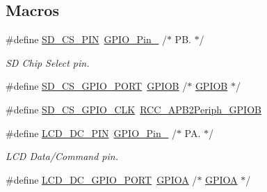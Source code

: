\subsection*{Macros}
\begin{DoxyCompactItemize}
\item 
\#define \mbox{\hyperlink{group___s_t_m32_f1_x_x___n_u_c_l_e_o___l_o_w___l_e_v_e_l___exported___constants_ga04d57a6c18b2d5e81f31093e58ed0c62}{S\+D\+\_\+\+C\+S\+\_\+\+P\+IN}}~\mbox{\hyperlink{group___g_p_i_o__pins__define_ga32dbe930f52ce5ab60190c65e9dc741e}{G\+P\+I\+O\+\_\+\+Pin\+\_}}                  /$\ast$ P\+B. $\ast$/
\begin{DoxyCompactList}\small\item\em SD Chip Select pin. \end{DoxyCompactList}\item 
\#define \mbox{\hyperlink{group___s_t_m32_f1_x_x___n_u_c_l_e_o___l_o_w___l_e_v_e_l___exported___constants_gaaaff9bd4922137edd642571ec1cafda3}{S\+D\+\_\+\+C\+S\+\_\+\+G\+P\+I\+O\+\_\+\+P\+O\+RT}}~\mbox{\hyperlink{group___peripheral__declaration_ga68b66ac73be4c836db878a42e1fea3cd}{G\+P\+I\+OB}}                       /$\ast$ \mbox{\hyperlink{group___peripheral__declaration_ga68b66ac73be4c836db878a42e1fea3cd}{G\+P\+I\+OB}} $\ast$/
\item 
\#define \mbox{\hyperlink{group___s_t_m32_f1_x_x___n_u_c_l_e_o___l_o_w___l_e_v_e_l___exported___constants_ga7be3542936287b33064681e089451c7c}{S\+D\+\_\+\+C\+S\+\_\+\+G\+P\+I\+O\+\_\+\+C\+LK}}~\mbox{\hyperlink{group___a_p_b2__peripheral_ga8c8909c3640508e9ce31dff80010a6dd}{R\+C\+C\+\_\+\+A\+P\+B2\+Periph\+\_\+\+G\+P\+I\+OB}}
\item 
\#define \mbox{\hyperlink{group___s_t_m32_f1_x_x___n_u_c_l_e_o___l_o_w___l_e_v_e_l___exported___constants_ga402d8ccd0bb0a6cc377222e75b8e050e}{L\+C\+D\+\_\+\+D\+C\+\_\+\+P\+IN}}~\mbox{\hyperlink{group___g_p_i_o__pins__define_gaad1891082d5d6bcac06c2729a9fdd2f0}{G\+P\+I\+O\+\_\+\+Pin\+\_}}                  /$\ast$ P\+A. $\ast$/
\begin{DoxyCompactList}\small\item\em L\+CD Data/\+Command pin. \end{DoxyCompactList}\item 
\#define \mbox{\hyperlink{group___s_t_m32_f1_x_x___n_u_c_l_e_o___l_o_w___l_e_v_e_l___exported___constants_gab5a6486a69fe569816e674dfd75390d3}{L\+C\+D\+\_\+\+D\+C\+\_\+\+G\+P\+I\+O\+\_\+\+P\+O\+RT}}~\mbox{\hyperlink{group___peripheral__declaration_gac485358099728ddae050db37924dd6b7}{G\+P\+I\+OA}}                       /$\ast$ \mbox{\hyperlink{group___peripheral__declaration_gac485358099728ddae050db37924dd6b7}{G\+P\+I\+OA}} $\ast$/

\end{DoxyCompactItemize}
